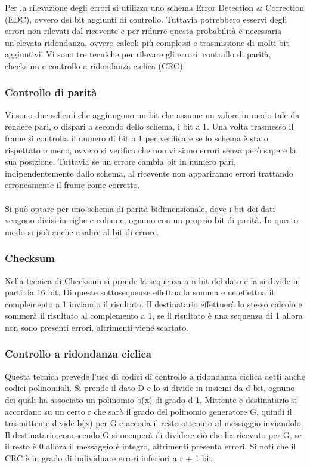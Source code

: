 \documentclass{subfiles}
\begin{document}
    Per la rilevazione degli errori si utilizza uno schema Error Detection \& Correction (EDC), ovvero dei bit aggiunti di controllo. 
    Tuttavia potrebbero esservi degli errori non rilevati dal ricevente e per ridurre questa probabilità è necessaria un'elevata 
    ridondanza, ovvero calcoli più complessi e trasmissione di molti bit aggiuntivi. Vi sono tre tecniche per rilevare gli errori: 
    controllo di parità, checksum e controllo a ridondanza ciclica (CRC). 

\subsubsection{Controllo di parità}
    Vi sono due schemi che aggiungono un bit che assume un valore in modo tale da rendere pari, o dispari a secondo dello schema, i bit 
    a 1. Una volta trasmesso il frame si controlla il numero di bit a 1 per verificare se lo schema è stato rispettato o meno, ovvero si 
    verifica che non vi siano errori senza però sapere la sua posizione. Tuttavia se un errore cambia bit in numero pari, 
    indipendentemente dallo schema, al ricevente non appariranno errori trattando erroneamente il frame come corretto. \\ \\
    Si può optare per uno schema di parità bidimensionale, dove i bit dei dati vengono divisi in righe e colonne, ognuno con un proprio 
    bit di parità. In questo modo si può anche risalire al bit di errore.

\subsubsection{Checksum}
    Nella tecnica di Checksum si prende la sequenza a n bit del dato e la si divide in parti da 16 bit. Di queste sottosequenze effettua 
    la somma e ne effettua il complemento a 1 inviando il risultato. Il destinatario effettuerà lo stesso calcolo e sommerà il risultato 
    al complemento a 1, se il risultato è una sequenza di 1 allora non sono presenti errori, altrimenti viene scartato.

\subsubsection{Controllo a ridondanza ciclica}
    Questa tecnica prevede l'uso di codici di controllo a ridondanza ciclica detti anche codici polinomiali. Si prende il dato D e lo si 
    divide in insiemi da d bit, ognuno dei quali ha associato un polinomio b(x) di grado d-1. Mittente e destinatario si accordano su un 
    certo r che sarà il grado del polinomio generatore G, quindi il trasmittente divide b(x) per G e accoda il resto ottenuto al 
    messaggio inviandolo. Il destinatario conoscendo G si occuperà di dividere ciò che ha ricevuto per G, se il resto è 0 allora il 
    messaggio è integro, altrimenti presenta errori. Si noti che il CRC è in grado di individuare errori inferiori a r + 1 bit.
\end{document}
